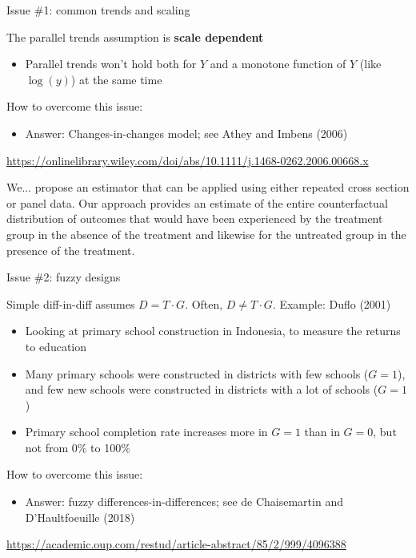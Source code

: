 \documentclass[compress, 8pt]{beamer}
\begin{document}
\begin{frame}{Issue \#1: common trends and scaling}

The parallel trends assumption is \textbf{scale dependent}
\begin{itemize}
    \item Parallel trends won't hold both for $Y$ and a monotone function of $Y$ (like $\log (y)$) at the same time
\end{itemize}

\vspace{3ex}
How to overcome this issue:
\begin{itemize}
    \item Answer: Changes-in-changes model; see Athey and Imbens (2006)
\end{itemize}
\url{https://onlinelibrary.wiley.com/doi/abs/10.1111/j.1468-0262.2006.00668.x}

\vspace{3ex}
\begin{displayquote}
We... propose an estimator that can be applied using either repeated cross section or panel data. Our approach provides an estimate of the entire counterfactual distribution of outcomes that would have been experienced by the treatment group in the absence of the treatment and likewise for the untreated group in the presence of the treatment.
\end{displayquote}

\end{frame}

\begin{frame}{Issue \#2: fuzzy designs}

Simple diff-in-diff assumes $D = T \cdot G$. Often, $D \neq T \cdot G$. Example: Duflo (2001)
\begin{itemize}
    \item Looking at primary school construction in Indonesia, to measure the returns to education
    \item Many primary schools were constructed in districts with few schools ($G=1$), and few new schools were constructed in districts with a lot of schools ($G=1$)
    \item Primary school completion rate increases more in $G=1$ than in $G=0$, but not from 0\% to 100\%
\end{itemize}

\vspace{3ex}
How to overcome this issue:
\begin{itemize}
    \item Answer: fuzzy differences-in-differences; see de Chaisemartin and D'Haultfoeuille (2018)
\end{itemize}
\url{https://academic.oup.com/restud/article-abstract/85/2/999/4096388}
\end{frame}
\end{document}
